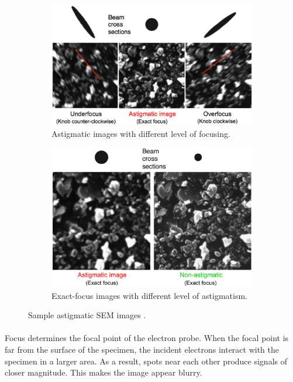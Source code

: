 \documentclass[12pt, twocolumn]{report}
\begin{document}
\begin{figure}[htbp]
    \centering
    \begin{subfigure}{0.45\textwidth}
        \centering
        \includegraphics[width=1\textwidth]{Figures/SEM sample images astigmatism a.jpeg}
        \caption{Astigmatic images with different level of focusing.}
    \end{subfigure}
    \begin{subfigure}{0.45\textwidth}
        \centering
        \includegraphics[width=1\textwidth]{Figures/SEM sample images astigmatism b.jpeg}
        \caption{Exact-focus images with different level of astigmatism.}
    \end{subfigure}
    \caption{Sample astigmatic SEM images \cite{SEM astigmatism correction}.}
    \label{SEM sample images}
\end{figure}

\paragraph{}
Focus determines the focal point of the electron probe. When the focal point is far from the surface of the specimen, the incident electrons interact with the specimen in a larger area. As a result, spots near each other produce signals of closer magnitude. This makes the image appear blurry.
\end{document}
